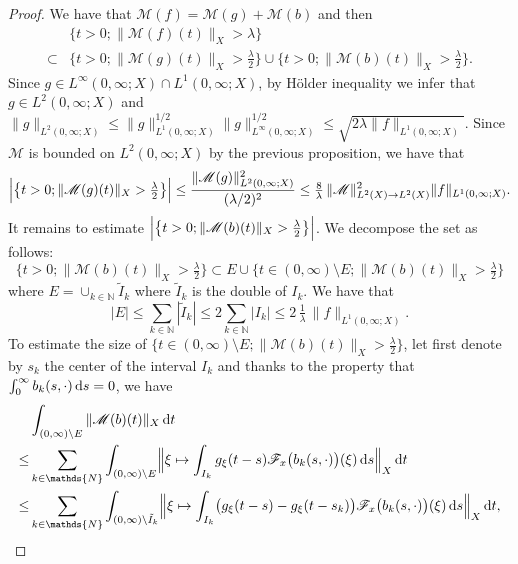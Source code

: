 \documentclass[a4paper, 12pt]{article}
\theoremstyle{plain}
\theoremstyle{definition}
\theoremstyle{remark}
\numberwithin{equation}{section}
\begin{document}
\begin{proof}
\noindent
We have that ${\mathscr{M}}(f)={\mathscr{M}}(g)+ {\mathscr{M}}(b)$ and then
%
\begin{align}
&\bigl\{t>0; \|{\mathscr{M}}(f)(t)\|_X> \lambda\bigr\} \nonumber\\
\subset &\bigl\{t>0; \|{\mathscr{M}}(g)(t)\|_X> \tfrac{\lambda}{2}\bigr\}
\cup \bigl\{t>0; \|{\mathscr{M}}(b)(t)\|_X> \tfrac{\lambda}{2}\bigr\}. \label{eq:0}
\end{align}
%
Since $g\in L^\infty(0,\infty;X)\cap L^1(0,\infty;X)$, by H\"older inequality we infer that $g\in L^2(0,\infty;X)$ and
$\|g\|_{L^2(0,\infty;X)}\le \|g\|_{L^1(0,\infty;X)}^{1/2}\|g\|_{L^\infty(0,\infty;X)}^{1/2}\le \sqrt{2\lambda \|f\|_{L^1(0,\infty;X)}}$. Since
${\mathscr{M}}$ is bounded on $L^2(0,\infty;X)$ by the previous proposition, we have that
%
\begin{equation}
\label{eq:1}
\Bigl|\bigl\{t>0; \|{\mathscr{M}}(g)(t)\|_X> \tfrac{\lambda}{2}\bigr\}\Bigr|\le \frac{\|{\mathscr{M}}(g)\|^2_{L^2(0,\infty;X)}}{(\lambda/2)^2}
\le \tfrac{8}{\lambda}\, \|{\mathscr{M}}\|_{L^2(X)\to L^2(X)}^2 \|f\|_{L^1(0,\infty;X)}.
\end{equation}
%
It remains to estimate $\Bigl|\bigl\{t>0; \|{\mathscr{M}}(b)(t)\|_X> \tfrac{\lambda}{2}\bigr\}\Bigr|$. We decompose the set as follows:
\[
\bigl\{t>0; \|{\mathscr{M}}(b)(t)\|_X> \tfrac{\lambda}{2}\bigr\}\subset 
E \cup \bigl\{t\in (0,\infty)\setminus E; \|{\mathscr{M}}(b)(t)\|_X> \tfrac{\lambda}{2}\bigr\}
\]
where $E=\cup_{k\in{\mathds{N}}} \tilde{I}_k$ where $\tilde{I}_k$ is the double of $I_k$. We have that
%
\begin{equation}
\label{eq:2}
|E| \le \sum_{k\in{\mathds{N}}}|\tilde{I}_k| \le 2 \sum_{k\in{\mathds{N}}}|I_k|\le 2\,\tfrac{1}{\lambda}\,\|f\|_{L^1(0,\infty;X)}.
\end{equation}
%
To estimate the size of $\bigl\{t\in (0,\infty)\setminus E; \|{\mathscr{M}}(b)(t)\|_X> \tfrac{\lambda}{2}\bigr\}$, let first denote by $s_k$ 
the center of the interval $I_k$ and thanks to the property that $\int_0^\infty b_k(s,\cdot)\,{\rm d}s=0$, we have
%
\begin{align*}
&\int_{(0,\infty)\setminus E}\|{\mathscr{M}}(b)(t)\|_X\, {\rm d}t\\
\le & \sum_{k\in{\mathds{N}}}\int_{(0,\infty)\setminus E} 
\Bigl\|\xi\mapsto \int_{I_k} g_{\xi}(t-s){\mathscr{F}}_x\bigl(b_k(s,\cdot)\bigr)(\xi)\,{\rm d}s\Bigr\|_X\,{\rm d}t\\
\le& \sum_{k\in{\mathds{N}}}\int_{(0,\infty)\setminus \tilde{I}_k} 
\Bigl\|\xi\mapsto \int_{I_k} \bigl(g_{\xi}(t-s)-g_\xi(t-s_k)\bigr){\mathscr{F}}_x\bigl(b_k(s,\cdot)\bigr)(\xi)\,{\rm d}s\Bigr\|_X\,{\rm d}t,

\end{align*}
\end{proof}
\end{document}
